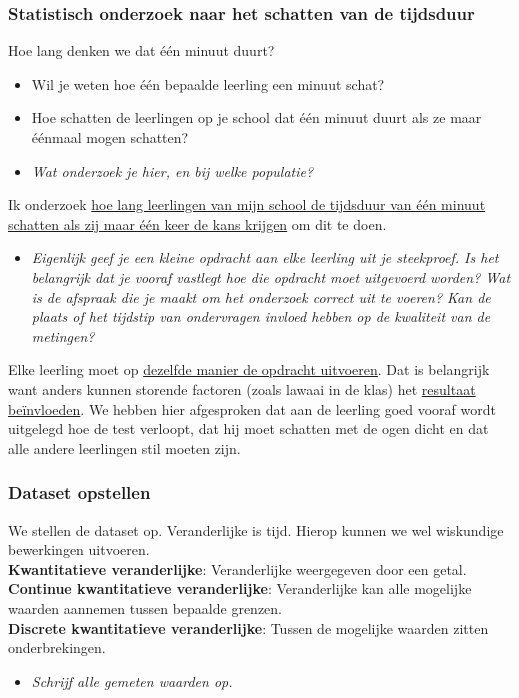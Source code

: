 \documentclass[dutch]{beamer}
\newcommand{\vraag}[1]{\begin{itemize}\item[Vraag:] {\it #1}\end{itemize}}
\begin{document}
\begin{frame}
\frametitle{Statistisch onderzoek naar het schatten van de tijdsduur}
Hoe lang denken we dat één minuut duurt?
\begin{itemize}
  \item Wil je weten hoe één bepaalde leerling een minuut schat?
  \item Hoe schatten de leerlingen op je school dat één minuut duurt als ze maar éénmaal mogen schatten?
\end{itemize}
\pause
\vraag{Wat onderzoek je hier, en bij welke populatie?}
\pause
Ik onderzoek \uline{hoe lang leerlingen van mijn school de tijdsduur van één minuut schatten als zij
maar één keer de kans krijgen} om dit te doen.
\pause
\vraag{Eigenlijk geef je een kleine opdracht aan elke leerling uit je steekproef. Is het belangrijk dat
je vooraf vastlegt hoe die opdracht moet uitgevoerd worden? Wat is de afspraak die je maakt
om het onderzoek correct uit te voeren? Kan de plaats of het tijdstip van ondervragen
invloed hebben op de kwaliteit van de metingen?}
\pause
Elke leerling moet op \uline{dezelfde manier de opdracht uitvoeren}. Dat is belangrijk want anders
kunnen storende factoren (zoals lawaai in de klas) het \uline{resultaat beïnvloeden}. We hebben hier
afgesproken dat aan de leerling goed vooraf wordt uitgelegd hoe de test verloopt, dat hij
moet schatten met de ogen dicht en dat alle andere leerlingen stil moeten zijn.
\end{frame}

\begin{frame}
\frametitle{Dataset opstellen}
We stellen de dataset op. Veranderlijke is tijd. Hierop kunnen we wel wiskundige bewerkingen uitvoeren.\\
\vspace*{0.5cm}
\pause
{\bf Kwantitatieve veranderlijke}: Veranderlijke weergegeven door een getal.\\
{\bf Continue kwantitatieve veranderlijke}: Veranderlijke kan alle mogelijke waarden aannemen tussen bepaalde grenzen.\\
{\bf Discrete kwantitatieve veranderlijke}: Tussen de mogelijke waarden zitten onderbrekingen.\\

\pause
\vraag{Schrijf alle gemeten waarden op.}
\end{frame}
\end{document}
